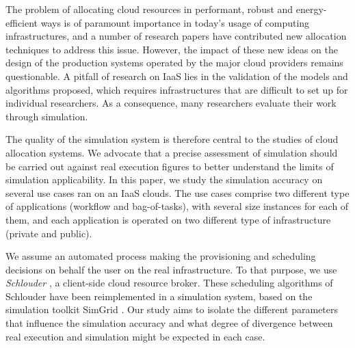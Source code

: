 



The  problem   of  allocating   cloud  resources   in  performant,   robust  and
energy-efficient ways is  of paramount importance in today's  usage of computing
infrastructures, and a number of research papers have contributed new allocation
techniques to address this issue.  However, the impact of these new ideas on the
design of the  production systems operated by the major  cloud providers remains
questionable.   A pitfall  of research  on IaaS  lies in  the validation  of the
models  and  algorithms  proposed,   which  requires  infrastructures  that  are
difficult  to  set  up  for  individual  researchers.  As  a  consequence,  many
researchers evaluate their work through simulation.

The quality  of the  simulation system  is therefore central  to the  studies of
cloud allocation  systems. We advocate  that a precise assessment  of simulation
should be  carried out against real  execution figures to better  understand the
limits  of simulation  applicability. In  this  paper, we  study the  simulation
accuracy on several use cases ran on  an IaaS clouds. The use cases comprise two
different type  of applications (workflow  and bag-of-tasks), with  several size
instances for  each of them, and  each application is operated  on two different
type of infrastructure (private and public).


We assume an automated process  making the provisioning and scheduling decisions
on  behalf  the user  on  the  real infrastructure.   To  that  purpose, we  use
\emph{Schlouder} \cite{}, a client-side cloud resource broker.  These scheduling
algorithms of Schlouder have been reimplemented in a simulation system, based on
the simulation toolkit SimGrid \cite{simgrid08}.   Our study aims to isolate the
different parameters that  influence the simulation accuracy and  what degree of
divergence between real execution and simulation might be expected in each case.






